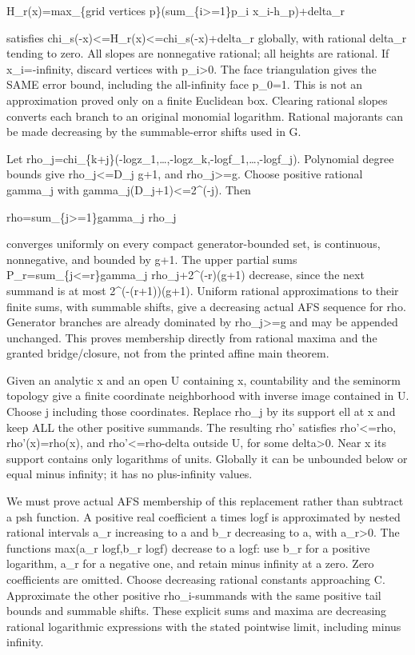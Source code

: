 \documentclass[
  10pt,
]{article}
\begin{document}
H\_r(x)=max\_\{grid vertices p\}(sum\_\{i\textgreater=1\}p\_i
x\_i-h\_p)+delta\_r

satisfies chi\_s(-x)\textless=H\_r(x)\textless=chi\_s(-x)+delta\_r
globally, with rational delta\_r tending to zero. All slopes are
nonnegative rational; all heights are rational. If x\_i=-infinity,
discard vertices with p\_i\textgreater0. The face triangulation gives
the SAME error bound, including the all-infinity face p\_0=1. This is
not an approximation proved only on a finite Euclidean box. Clearing
rational slopes converts each branch to an original monomial logarithm.
Rational majorants can be made decreasing by the summable-error shifts
used in G.

Let
rho\_j=chi\_\{k+j\}(-log\textbar z\_1\textbar,\ldots,-log\textbar z\_k\textbar,-log\textbar f\_1\textbar,\ldots,-log\textbar f\_j\textbar).
Polynomial degree bounds give rho\_j\textless=D\_j g+1, and
rho\_j\textgreater=g. Choose positive rational gamma\_j with
gamma\_j(D\_j+1)\textless=2\^{}(-j). Then

rho=sum\_\{j\textgreater=1\}gamma\_j rho\_j

converges uniformly on every compact generator-bounded set, is
continuous, nonnegative, and bounded by g+1. The upper partial sums
P\_r=sum\_\{j\textless=r\}gamma\_j rho\_j+2\^{}(-r)(g+1) decrease, since
the next summand is at most 2\^{}(-(r+1))(g+1). Uniform rational
approximations to their finite sums, with summable shifts, give a
decreasing actual AFS sequence for rho. Generator branches are already
dominated by rho\_j\textgreater=g and may be appended unchanged. This
proves membership directly from rational maxima and the granted
bridge/closure, not from the printed affine main theorem.

Given an analytic x and an open U containing x, countability and the
seminorm topology give a finite coordinate neighborhood with inverse
image contained in U. Choose j including those coordinates. Replace
rho\_j by its support ell at x and keep ALL the other positive summands.
The resulting rho' satisfies rho'\textless=rho, rho'(x)=rho(x), and
rho'\textless=rho-delta outside U, for some delta\textgreater0. Near x
its support contains only logarithms of units. Globally it can be
unbounded below or equal minus infinity; it has no plus-infinity values.

We must prove actual AFS membership of this replacement rather than
subtract a psh function. A positive real coefficient a times
log\textbar f\textbar{} is approximated by nested rational intervals
a\_r increasing to a and b\_r decreasing to a, with a\_r\textgreater0.
The functions max(a\_r log\textbar f\textbar,b\_r log\textbar f\textbar)
decrease to a log\textbar f\textbar: use b\_r for a positive logarithm,
a\_r for a negative one, and retain minus infinity at a zero. Zero
coefficients are omitted. Choose decreasing rational constants
approaching C. Approximate the other positive rho\_i-summands with the
same positive tail bounds and summable shifts. These explicit sums and
maxima are decreasing rational logarithmic expressions with the stated
pointwise limit, including minus infinity.
\end{document}
